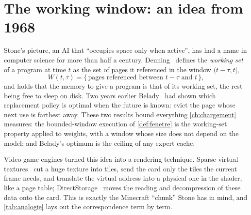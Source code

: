 \section{The working window: an idea from 1968}\label{sec:etat-fenetre}

Stone's picture, an AI that ``occupies space only when active'', has had a name in computer science for more than half a century. Denning~\cite{denning1968workingset} defines the \emph{working set} of a program at time $t$ as the set of pages it referenced in the window $(t - \tau, t]$,
\[
W(t, \tau) = \{\, \text{pages referenced between } t - \tau \text{ and } t \,\},
\]
and holds that the memory to give a program is that of its working set, the rest being free to sleep on disk. Two years earlier Belady~\cite{belady1966} had shown which replacement policy is optimal when the future is known: evict the page whose next use is farthest away. These two results bound everything \cref{ch:chargement} measures: the bounded-window execution of \cref{def:fenetre} is the working-set property applied to weights, with a window whose size does not depend on the model; and Belady's optimum is the ceiling of any expert cache.

Video-game engines turned this idea into a rendering technique. Sparse virtual textures~\cite{barrett2008svt} cut a huge texture into tiles, send the card only the tiles the current frame needs, and translate the virtual address into a physical one in the shader, like a page table; DirectStorage~\cite{directstorage14} moves the reading and decompression of these data onto the card. This is exactly the Minecraft ``chunk'' Stone has in mind, and \cref{tab:analogie} lays out the correspondence term by term.

